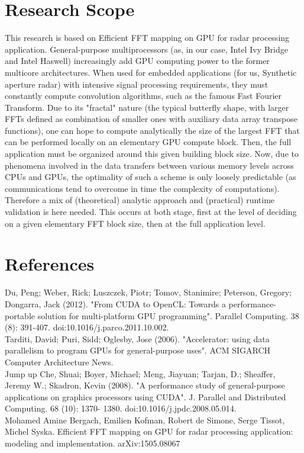 \documentclass{report}
\begin{document}
\section{Research Scope}
This research is based on Efficient FFT mapping on GPU for radar processing application. General-purpose multiprocessors (as, in our case, Intel Ivy Bridge and Intel Haswell) increasingly add GPU computing power to the former multicore architectures. When used for embedded applications (for us, Synthetic aperture radar) with intensive signal processing requirements, they must constantly compute convolution algorithms, such as the famous Fast Fourier Transform. Due to its "fractal" nature (the typical butterfly shape, with larger FFTs defined as combination of smaller ones with auxiliary data array transpose functions), one can hope to compute analytically the size of the largest FFT that can be performed locally on an elementary GPU compute block. Then, the full application must be organized around this given building block size. Now, due to phenomena involved in the data transfers between various memory levels across CPUs and GPUs, the optimality of such a scheme is only loosely predictable (as communications tend to overcome in time the complexity of computations). Therefore a mix of (theoretical) analytic approach and (practical) runtime validation is here needed. This occurs at both stage, first at the level of deciding on a given elementary FFT block size, then at the full application level.

\section{References}
Du, Peng; Weber, Rick; Luszczek, Piotr; Tomov, Stanimire; Peterson, Gregory; Dongarra, Jack (2012). "From CUDA to OpenCL: Towards a performance-portable solution for multi-platform GPU programming". Parallel Computing. 38 (8): 391-407. doi:10.1016/j.parco.2011.10.002.\\


Tarditi, David; Puri, Sidd; Oglesby, Jose (2006). "Accelerator: using data parallelism to program GPUs for general-purpose uses". ACM SIGARCH Computer Architecture News. \\


Jump up Che, Shuai; Boyer, Michael; Meng, Jiayuan; Tarjan, D.; Sheaffer, Jeremy W.; Skadron, Kevin (2008). "A performance study of general-purpose applications on graphics processors using CUDA". J. Parallel and Distributed Computing. 68 (10): 1370- 1380. doi:10.1016/j.jpdc.2008.05.014.\\

Mohamed Amine Bergach, Emilien Kofman, Robert de Simone, Serge Tissot, Michel Syska. Efficient FFT mapping on GPU for radar processing application: modeling and implementation. arXiv:1505.08067\\



 

 
\end{document}
